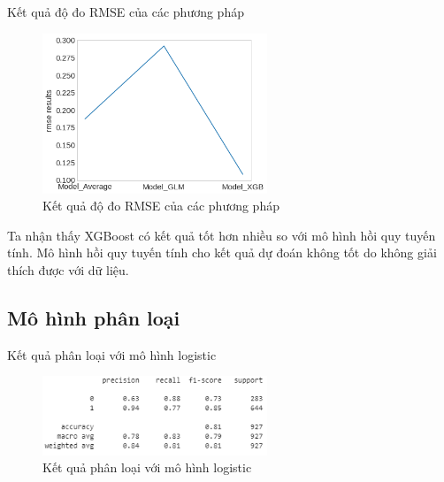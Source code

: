 \documentclass[10pt]{beamer}
\theoremstyle{remark}
\theoremstyle{definition}
\begin{document}
\begin{frame}{Kết quả độ đo RMSE của các phương pháp}
	\begin{figure}[h!]
        \centering
        \includegraphics[width=0.6\textwidth]{figures/Regression_Model_Result_RMSE.png}
        \caption{Kết quả độ đo RMSE của các phương pháp}
    \end{figure}
	Ta nhận thấy XGBoost có kết quả tốt hơn nhiều so với mô hình hồi quy tuyến tính.
    Mô hình hồi quy tuyến tính cho kết quả dự đoán không tốt do không giải thích được với dữ liệu.
\end{frame}

\subsection{Mô hình phân loại}

\begin{frame}{Kết quả phân loại với mô hình logistic}
	\begin{figure}[h!]
        \centering
        \includegraphics[width=0.6\textwidth]{figures/Logistic_Regression_Report.png}
        \caption{Kết quả phân loại với mô hình logistic}
    \end{figure}
\end{frame}
\end{document}
